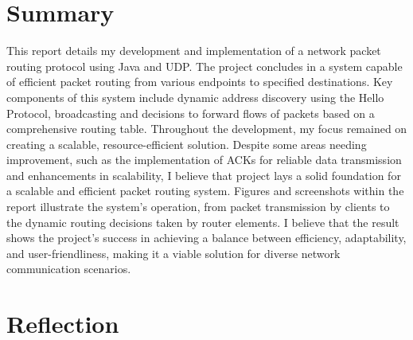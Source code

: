 \documentclass{article}
\begin{document}
\section{Summary}
\label{sec:Summary}

This report details my development and implementation of a network packet routing protocol using Java and UDP. The project concludes in a system capable of efficient packet routing from various endpoints to specified destinations. Key components of this system include dynamic address discovery using the Hello Protocol, broadcasting and decisions to forward flows of packets based on a comprehensive routing table. 
Throughout the development, my focus remained on creating a scalable, resource-efficient solution. Despite some areas needing improvement, such as the implementation of ACKs for reliable data transmission and enhancements in scalability, I believe that project lays a solid foundation for a scalable and efficient packet routing system. 
Figures and screenshots within the report illustrate the system's operation, from packet transmission by clients to the dynamic routing decisions taken by router elements. I believe that the result shows the project's success in achieving a balance between efficiency, adaptability, and user-friendliness, making it a viable solution for diverse network communication scenarios.


\section{Reflection}
\label{sec:Reflection}
\end{document}
